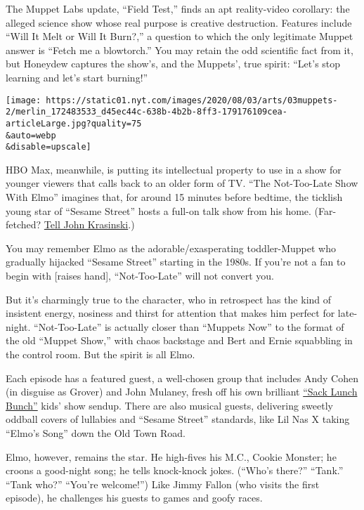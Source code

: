 The Muppet Labs update, ``Field Test,'' finds an apt reality-video
corollary: the alleged science show whose real purpose is creative
destruction. Features include ``Will It Melt or Will It Burn?,'' a
question to which the only legitimate Muppet answer is ``Fetch me a
blowtorch.'' You may retain the odd scientific fact from it, but
Honeydew captures the show's, and the Muppets', true spirit: ``Let's
stop learning and let's start burning!''

\texttt{[image: https://static01.nyt.com/images/2020/08/03/arts/03muppets-2/merlin\_172483533\_d45ec44c-638b-4b2b-8ff3-179176109cea-articleLarge.jpg?quality=75\\\&auto=webp\\\&disable=upscale]}

HBO Max, meanwhile, is putting its intellectual property to use in a
show for younger viewers that calls back to an older form of TV. ``The
Not-Too-Late Show With Elmo'' imagines that, for around 15 minutes
before bedtime, the ticklish young star of ``Sesame Street'' hosts a
full-on talk show from his home. (Far-fetched?
\href{https://www.nytimes.com/2020/04/29/arts/television/john-krasinski-some-good-news.html}{Tell
John Krasinski}.)

You may remember Elmo as the adorable/exasperating toddler-Muppet who
gradually hijacked ``Sesame Street'' starting in the 1980s. If you're
not a fan to begin with {[}raises hand{]}, ``Not-Too-Late'' will not
convert you.

But it's charmingly true to the character, who in retrospect has the
kind of insistent energy, nosiness and thirst for attention that makes
him perfect for late-night. ``Not-Too-Late'' is actually closer than
``Muppets Now'' to the format of the old ``Muppet Show,'' with chaos
backstage and Bert and Ernie squabbling in the control room. But the
spirit is all Elmo.

Each episode has a featured guest, a well-chosen group that includes
Andy Cohen (in disguise as Grover) and John Mulaney, fresh off his own
brilliant
\href{https://www.nytimes.com/2019/12/24/arts/television/john-mulaney-sack-lunch-bunch-netflix.html}{``Sack
Lunch Bunch''} kids' show sendup. There are also musical guests,
delivering sweetly oddball covers of lullabies and ``Sesame Street''
standards, like Lil Nas X taking ``Elmo's Song'' down the Old Town Road.

Elmo, however, remains the star. He high-fives his M.C., Cookie Monster;
he croons a good-night song; he tells knock-knock jokes. (``Who's
there?'' ``Tank.'' ``Tank who?'' ``You're welcome!'') Like Jimmy Fallon
(who visits the first episode), he challenges his guests to games and
goofy races.

